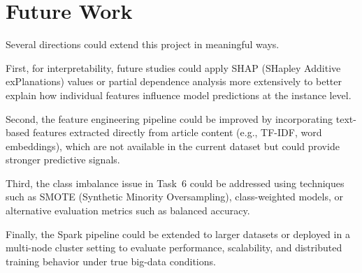 \section{Future Work}

Several directions could extend this project in meaningful ways.

First, for interpretability, future studies could apply SHAP (SHapley Additive exPlanations) values or partial dependence analysis more extensively to better explain how individual features influence model predictions at the instance level.

Second, the feature engineering pipeline could be improved by incorporating text-based features extracted directly from article content (e.g., TF-IDF, word embeddings), which are not available in the current dataset but could provide stronger predictive signals.

Third, the class imbalance issue in Task~6 could be addressed using techniques such as SMOTE (Synthetic Minority Oversampling), class-weighted models, or alternative evaluation metrics such as balanced accuracy.

Finally, the Spark pipeline could be extended to larger datasets or deployed in a multi-node cluster setting to evaluate performance, scalability, and distributed training behavior under true big-data conditions.

